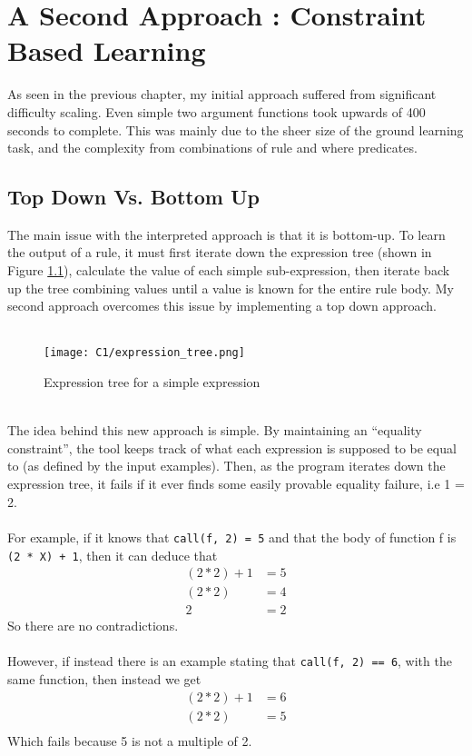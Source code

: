 \chapter{A Second Approach : Constraint Based Learning}

As seen in the previous chapter, my initial approach suffered from significant difficulty scaling. Even simple two argument functions took upwards of 400 seconds to complete. This was mainly due to the sheer size of the ground learning task, and the complexity from combinations of rule and where predicates.

\section{Top Down Vs. Bottom Up}
The main issue with the interpreted approach is that it is bottom-up. To learn the output of a rule, it must first iterate down the expression tree (shown in Figure \ref{fig:expr_tree_2}), calculate the value of each simple sub-expression, then iterate back up the tree combining values until a value is known for the entire rule body. My second approach overcomes this issue by implementing a top down approach. \\ \\

\begin{figure}[h!]
\centering
\texttt{[image: C1/expression\_tree.png]}
\caption{Expression tree for a simple expression}
\label{fig:expr_tree_2}
\end{figure}
\mbox{}\\
The idea behind this new approach is simple. By maintaining an ``equality constraint'', the tool keeps track of what each expression is supposed to be equal to (as defined by the input examples). Then, as the program iterates down the expression tree, it fails if it ever finds some easily provable equality failure, i.e 1 = 2. \\ \\
For example, if it knows that \lstinline{call(f, 2) = 5} and that the body of function f is \lstinline{(2 * X) + 1}, then it can deduce that 
\begin{align*}
(2*2) + 1 &= 5 \\
(2*2) &= 4 \\
2 &= 2
\end{align*}
So there are no contradictions. \\ \\
However, if instead there is an example stating that \lstinline{call(f, 2) == 6}, with the same function, then instead we get %
\begin{align*}
(2*2) + 1 &= 6 \\
(2*2) &= 5 \\
\end{align*}
Which fails because 5 is not a multiple of 2.

